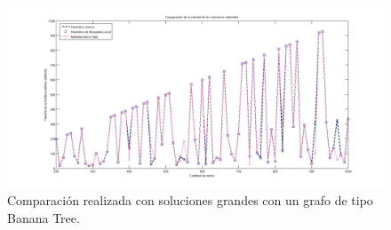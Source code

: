 \begin{figure}[H] %
\begin{center}
\includegraphics[width=500pt]{../imgs/calidadSolucionesGrandes3.jpg}
\caption{Comparación realizada con soluciones grandes con un grafo de tipo Banana Tree.}
\end{center}
\end{figure}
